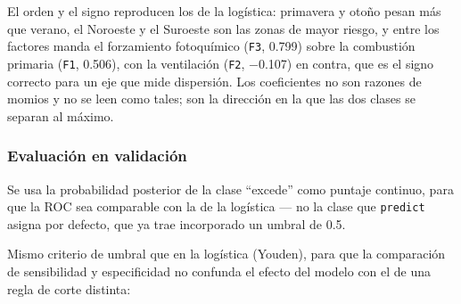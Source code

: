 \documentclass[
  spanish,
  letterpaper,
  DIV=11,
  numbers=noendperiod]{scrartcl}
\newenvironment{Shaded}{\begin{snugshade}}{\end{snugshade}}
\newcommand{\AttributeTok}[1]{\textcolor[rgb]{0.40,0.45,0.13}{#1}}
\newcommand{\CommentTok}[1]{\textcolor[rgb]{0.37,0.37,0.37}{#1}}
\newcommand{\ConstantTok}[1]{\textcolor[rgb]{0.56,0.35,0.01}{#1}}
\newcommand{\FunctionTok}[1]{\textcolor[rgb]{0.28,0.35,0.67}{#1}}
\newcommand{\NormalTok}[1]{\textcolor[rgb]{0.00,0.23,0.31}{#1}}
\newcommand{\OtherTok}[1]{\textcolor[rgb]{0.00,0.23,0.31}{#1}}
\newcommand{\SpecialCharTok}[1]{\textcolor[rgb]{0.37,0.37,0.37}{#1}}
\newcommand{\StringTok}[1]{\textcolor[rgb]{0.13,0.47,0.30}{#1}}
\begin{document}
El orden y el signo reproducen los de la logística: primavera y otoño
pesan más que verano, el Noroeste y el Suroeste son las zonas de mayor
riesgo, y entre los factores manda el forzamiento fotoquímico
(\texttt{F3}, 0.799) sobre la combustión primaria (\texttt{F1}, 0.506),
con la ventilación (\texttt{F2}, −0.107) en contra, que es el signo
correcto para un eje que mide dispersión. Los coeficientes no son
razones de momios y no se leen como tales; son la dirección en la que
las dos clases se separan al máximo.

\subsubsection{Evaluación en
validación}\label{evaluaciuxf3n-en-validaciuxf3n}

Se usa la probabilidad posterior de la clase ``excede'' como puntaje
continuo, para que la ROC sea comparable con la de la logística --- no
la clase que \texttt{predict} asigna por defecto, que ya trae
incorporado un umbral de 0.5.

\begin{Shaded}
\end{Shaded}

Mismo criterio de umbral que en la logística (Youden), para que la
comparación de sensibilidad y especificidad no confunda el efecto del
modelo con el de una regla de corte distinta:
\end{document}
